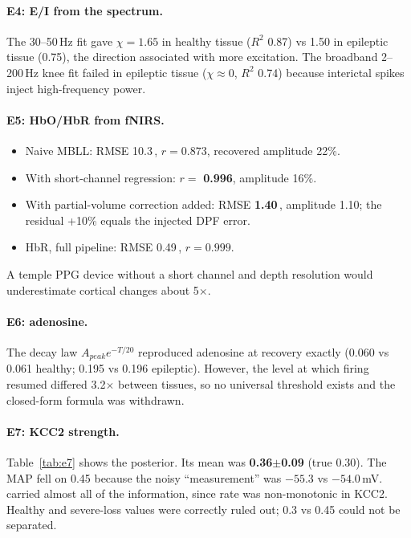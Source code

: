 \paragraph{E4: E/I from the spectrum.} The 30--50\,Hz fit gave $\chi=1.65$ in healthy tissue ($R^2$ 0.87) vs 1.50 in epileptic tissue (0.75), the direction associated with more excitation. The broadband 2--200\,Hz knee fit failed in epileptic tissue ($\chi\approx0$, $R^2$ 0.74) because interictal spikes inject high-frequency power.

\paragraph{E5: HbO/HbR from fNIRS.}
\begin{itemize}
\item Naive MBLL: RMSE 10.3\,\uM, $r=0.873$, recovered amplitude 22\%.
\item With short-channel regression: $r=$ \textbf{0.996}, amplitude 16\%.
\item With partial-volume correction added: RMSE \textbf{1.40}\,\uM, amplitude 1.10; the residual +10\% equals the injected DPF error.
\item HbR, full pipeline: RMSE 0.49\,\uM, $r=0.999$.
\end{itemize}
A temple PPG device without a short channel and depth resolution would underestimate cortical changes about 5$\times$.

\paragraph{E6: adenosine.} The decay law $A_{peak}e^{-T/20}$ reproduced adenosine at recovery exactly (0.060 vs 0.061 healthy; 0.195 vs 0.196 epileptic). However, the level at which firing resumed differed 3.2$\times$ between tissues, so no universal threshold exists and the closed-form formula was withdrawn.

\paragraph{E7: KCC2 strength.} Table~\ref{tab:e7} shows the posterior. Its mean was \textbf{0.36$\pm$0.09} (true 0.30). The MAP fell on 0.45 because the noisy \EGABA{} ``measurement'' was $-55.3$ vs $-54.0$\,mV. \EGABA{} carried almost all of the information, since rate was non-monotonic in KCC2. Healthy and severe-loss values were correctly ruled out; 0.3 vs 0.45 could not be separated.

